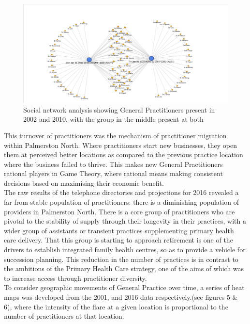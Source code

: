 \documentclass[11pt,a4paper]{article}
\begin{document}
\begin{figure}[htp]
\centering
\includegraphics[scale=0.4]{fig3.png}
\caption{Social network analysis showing General Practitioners present in 2002 and 2010, with the group in the middle present at both}
\label{General Practitioners present in 2002 and 2010}
\end{figure}


This turnover of practitioners was the mechanism of practitioner migration within Palmerston North. Where practitioners start new businesses, they open them at perceived better locations as compared to the previous practice location where the business failed to thrive. This makes new General Practitioners rational players in Game Theory, where rational means making consistent decisions based on maximising their economic benefit. \\


The raw results of the telephone directories and projections for 2016 revealed a far from stable population of practitioners: there is a diminishing population of providers in Palmerston North. There is a core group of practitioners who are pivotal to the stability of supply through their longevity in their practices, with a wider group of assistants or transient practices supplementing primary health care delivery. That this group is starting to approach retirement is one of the drivers to establish integrated family health centres, so as to provide a vehicle for succession planning. This reduction in the number of practices is in contrast to the ambitions of the Primary Health Care strategy, one of the aims of which was to increase access through practitioner diversity.  \\


To consider geographic movements of General Practice over time, a series of heat maps was developed from the 2001, and 2016 data respectively.(see figures 5 \& 6), where  the intensity of the flare at a given location is proportional to the number of practitioners at that location.\\ 
\end{document}
